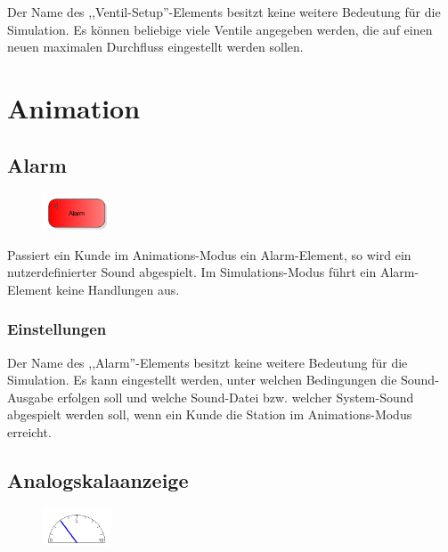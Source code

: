 Der Name des ,,Ventil-Setup''-Elements besitzt keine weitere Bedeutung für die Simulation.
Es können beliebige viele Ventile angegeben werden, die auf einen neuen maximalen Durchfluss
eingestellt werden sollen.





\chapter{Animation}

\section{Alarm}
\label{ref:ModelElementAnimationAlarm}

\begin{figure}
\vspace{-22pt}
\includegraphics[width=2cm]{imageModelElementAnimationAlarm.png}
\vspace{-22pt}
\end{figure}

Passiert ein Kunde im Animations-Modus ein Alarm-Element, so wird ein nutzerdefinierter Sound abgespielt.
Im Simulations-Modus führt ein Alarm-Element keine Handlungen aus.

\subsection*{Einstellungen}

Der Name des ,,Alarm''-Elements besitzt keine weitere Bedeutung für die Simulation.
Es kann eingestellt werden, unter welchen Bedingungen die Sound-Ausgabe erfolgen soll
und welche Sound-Datei bzw. welcher System-Sound abgespielt werden soll,
wenn ein Kunde die Station im Animations-Modus erreicht.


\section{Analogskalaanzeige}
\label{ref:ModelElementAnimationPointerMeasuring}

\begin{figure}
\vspace{-22pt}
\includegraphics[width=2cm]{imageModelElementAnimationPointerMeasuring.png}
\vspace{-22pt}
\end{figure}

